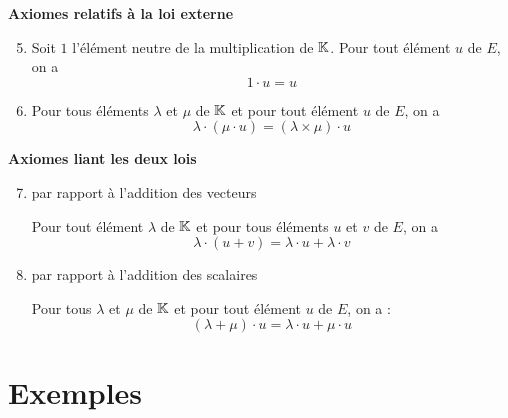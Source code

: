 \begin{frame}
\bigskip
\textbf{Axiomes relatifs à la loi externe}
   
\pause 
 \begin{enumerate}  \setcounter{enumi}{4}
 \item Soit $1$ l'élément neutre de la multiplication de $\mathbb{K}$. 
 Pour tout élément $u$ de $E$, on a 
 $$1 \cdot u=u$$
   
\pause  
 \item Pour tous éléments $\lambda$ et $\mu$ de $\mathbb{K}$ et pour tout élément $u$ de $E$, on a 
 $$\lambda \cdot (\mu \cdot u) = (\lambda \times \mu )\cdot u$$
 \end{enumerate} 
   
\pause  
\bigskip
\textbf{Axiomes liant les deux lois}
   
\pause 
 \begin{enumerate}  \setcounter{enumi}{6}
 \item {} par rapport à l'addition des vecteurs
 
 Pour tout élément  $\lambda$ de $\mathbb{K}$ et pour tous éléments $u$ et $v$ de $E$, on a 
 $$\lambda \cdot (u+v) =\lambda \cdot u + \lambda \cdot v$$
 
    
\pause 
 \item {} par rapport à l'addition des scalaires
 
 Pour tous $\lambda$ et $\mu$ de $\mathbb{K}$  et 
pour tout élément $u$ de $E$, on a :
$$(\lambda + \mu ) \cdot u=\lambda \cdot u + \mu \cdot u $$
 
 \end{enumerate} 
\end{frame}

\section{Exemples}

